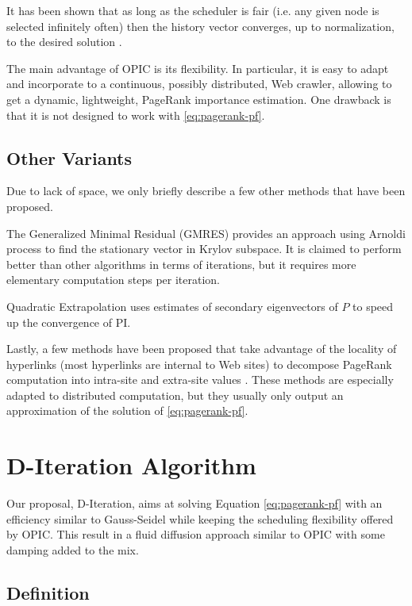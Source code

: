 \documentclass{llncs}
\begin{document}
It has been shown that as long as the scheduler is fair (i.e. any given node is selected infinitely often) then the history vector converges, up to normalization, to the desired solution \cite{AP03}.

The main advantage of OPIC is its flexibility. In particular, it is easy to adapt and incorporate to a continuous, possibly distributed, Web crawler, allowing to get a dynamic, lightweight, PageRank importance estimation. One drawback is that it is not designed to work with \eqref{eq:pagerank-pf}.




\subsection{Other Variants}

Due to lack of space, we only briefly describe a few other methods that have been proposed.

The Generalized Minimal Residual (GMRES) \cite{SS86} provides an approach using Arnoldi process to find the stationary vector in Krylov subspace. It is claimed to perform better than other algorithms in terms of iterations, but it requires more elementary computation steps per iteration.

Quadratic Extrapolation \cite{CG03} uses estimates of secondary eigenvectors of $ P $ to speed up the convergence of PI.

Lastly, a few methods have been proposed that take advantage of the locality of hyperlinks (most hyperlinks are internal to Web sites) to decompose PageRank computation into intra-site and extra-site values \cite{WD04,blockrank,flowrank}. These methods are especially adapted to distributed computation, but they usually only output an approximation of the solution of \eqref{eq:pagerank-pf}.

\section{D-Iteration Algorithm}\label{sec:d-iteration-algorithm}


Our proposal, D-Iteration, aims at solving Equation \eqref{eq:pagerank-pf} with an efficiency similar to Gauss-Seidel while keeping the scheduling flexibility offered by OPIC. This result in a fluid diffusion approach similar to OPIC with some damping added to the mix.

\subsection{Definition}
\end{document}

